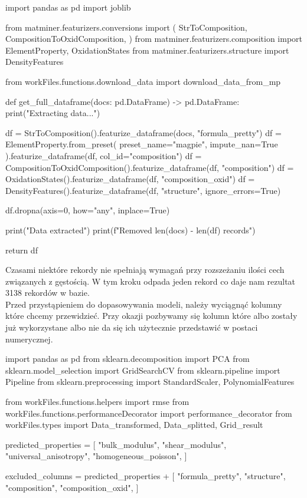 \begin{pythoncode}
import pandas as pd
import joblib

from matminer.featurizers.conversions import (
    StrToComposition,
    CompositionToOxidComposition,
)
from matminer.featurizers.composition import ElementProperty, OxidationStates
from matminer.featurizers.structure import DensityFeatures

from workFiles.functions.download_data import download_data_from_mp

def get_full_dataframe(docs: pd.DataFrame) -> pd.DataFrame:
    print("Extracting data...")

    df = StrToComposition().featurize_dataframe(docs, "formula_pretty")
    df = ElementProperty.from_preset(
        preset_name="magpie", impute_nan=True
    ).featurize_dataframe(df, col_id="composition")
    df = CompositionToOxidComposition().featurize_dataframe(df, "composition")
    df = OxidationStates().featurize_dataframe(df, "composition_oxid")
    df = DensityFeatures().featurize_dataframe(df, "structure", ignore_errors=True)

    df.dropna(axis=0, how="any", inplace=True)

    print("Data extracted")
    print(f"Removed {len(docs) - len(df)} records")

    return df
\end{pythoncode}
\hspace{1.5cm} Czasami niektóre rekordy nie spełniają wymagań przy rozszeżaniu ilości cech związanych z gęstością. W tym kroku odpada jeden rekord co daje nam rezultat 3138 rekordów w bazie.\\


\hspace{1.5cm} Przed przystąpieniem do dopasowywania modeli, należy wyciągnąć  kolumny które chcemy przewidzieć. Przy okazji pozbywamy się kolumn które albo zostały już wykorzystane albo nie da się ich użytecznie przedstawić w postaci numerycznej.

\begin{pythoncode}
import pandas as pd
from sklearn.decomposition import PCA
from sklearn.model_selection import GridSearchCV
from sklearn.pipeline import Pipeline
from sklearn.preprocessing import StandardScaler, PolynomialFeatures

from workFiles.functions.helpers import rmse
from workFiles.functions.performanceDecorator import performance_decorator
from workFiles.types import Data_transformed, Data_splitted, Grid_result

predicted_properties = [
    "bulk_modulus",
    "shear_modulus",
    "universal_anisotropy",
    "homogeneous_poisson",
]

excluded_columns = predicted_properties + [
    "formula_pretty",
    "structure",
    "composition",
    "composition_oxid",
]
\end{pythoncode} 

